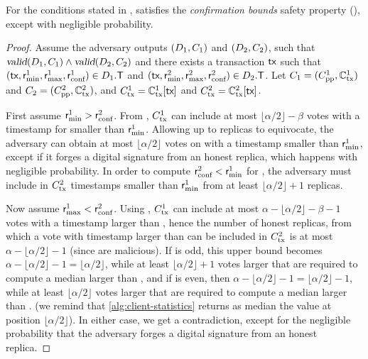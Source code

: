\begin{lemma}\label{lem:bounds-safety}
	For the conditions stated in ,  satisfies the \emph{confirmation bounds} safety property (), except with negligible probability.
\end{lemma}
\begin{proof}
	Assume the adversary outputs $(D_1, C_1)$ and $(D_2, C_2)$, such that $\textsl{valid}(D_1, C_1) \land \textsl{valid}(D_2, C_2)$ and there exists a transaction $\textsf{tx}$ such that $(\textsf{tx}, \textsf{r}_\text{min}^1, \textsf{r}_\text{max}^1, \textsf{r}_\text{conf}^1) \in D_1.\textsf{T}$ and $(\textsf{tx}, \textsf{r}_\text{min}^2, \textsf{r}_\text{max}^2, \textsf{r}_\text{conf}^2) \in D_2.\textsf{T}$.
	Let $C_1 = (C_\text{pp}^1, \mathbb{C}_\text{tx}^1)$ and $C_2 = (C_\text{pp}^2, \mathbb{C}_\text{tx}^2)$, and $C_\text{tx}^1 = \mathbb{C}_\text{tx}^1[\textsf{tx}]$ and $C_\text{tx}^2 = \mathbb{C}_\text{tx}^2[\textsf{tx}]$.

	First assume $\textsf{r}_\text{min}^1 > \textsf{r}_\text{conf}^2$.
	From , $C_\text{tx}^1$ can include at most $\lfloor \alpha / 2 \rfloor - \beta$ votes with a timestamp for \tx smaller than $\textsf{r}_\text{min}^1$.
	Allowing up to \beta replicas to equivocate, the adversary can obtain at most $\lfloor \alpha / 2 \rfloor$ votes on \tx with a timestamp smaller than $\textsf{r}_\text{min}^1$, except if it forges a digital signature from an honest replica, which happens with negligible probability.
	In order to compute $\textsf{r}_\text{conf}^2 < \textsf{r}_\text{min}^1$ for \tx, the adversary must include in $C_\text{tx}^2$ timestamps smaller than $\textsf{r}_\text{min}^1$ from at least $\lfloor \alpha / 2 \rfloor + 1$ replicas.

	Now assume $\textsf{r}_\text{max}^1 < \textsf{r}_\text{conf}^2$.
	Using , $C_\text{tx}^1$ can include at most $\alpha - \lfloor \alpha / 2 \rfloor - \beta - 1$ votes with a timestamp larger than \rmax,
	hence the number of honest replicas, from which a vote with timestamp larger than \rmax can be included in $C_\text{tx}^2$ is at most $\alpha - \lfloor \alpha / 2 \rfloor - 1$ (since \beta are malicious).
	If \alpha is odd, this upper bound becomes $\alpha - \lfloor \alpha / 2 \rfloor -1 = \lfloor \alpha / 2 \rfloor $, while at least
	$\lfloor \alpha / 2 \rfloor + 1$ votes larger that \rmax are required to compute a median larger than \rmax,
	and if \alpha is even, then $\alpha - \lfloor \alpha / 2 \rfloor - 1 = \lfloor \alpha / 2 \rfloor - 1$, while at least
	$\lfloor \alpha / 2 \rfloor$ votes larger that \rmax are required to compute a median larger than \rmax.
	(we remind that \cref{alg:client-statistics} returns as median the value at position $\lfloor \alpha /  2 \rfloor$).
	In either case, we get a contradiction, except for the negligible probability that the adversary forges a digital signature from an honest replica.
\end{proof}

